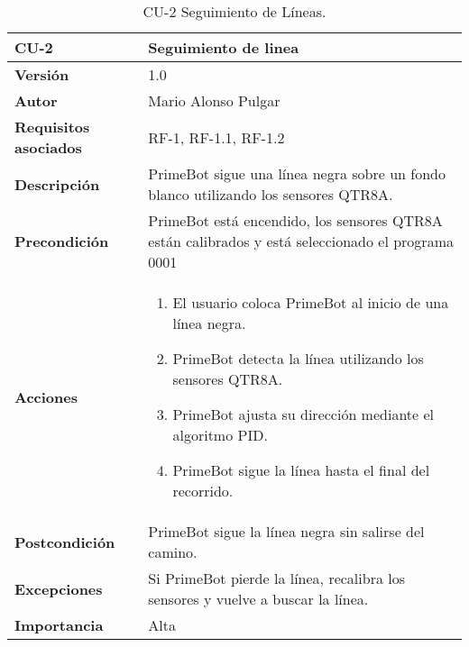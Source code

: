 \begin{table}[p]
	\centering
	\begin{tabularx}{\linewidth}{ p{} p{} }
		\toprule
		\textbf{CU-2}    & \textbf{Seguimiento de linea}\\
		\toprule
		\textbf{Versión}              & 1.0    \\
		\textbf{Autor}                & Mario Alonso Pulgar \\
		\textbf{Requisitos asociados} & RF-1, RF-1.1, RF-1.2\\
		\textbf{Descripción}          & PrimeBot sigue una línea negra sobre un fondo blanco utilizando los sensores QTR8A.\\
		\textbf{Precondición}         & PrimeBot está encendido, los sensores QTR8A están calibrados y está seleccionado el programa 0001\\
		\textbf{Acciones}             &
		\begin{enumerate}
			\def\labelenumi{\arabic{enumi}.}
			\tightlist
				\item El usuario coloca PrimeBot al inicio de una línea negra.
				\item PrimeBot detecta la línea utilizando los sensores QTR8A.
				\item PrimeBot ajusta su dirección mediante el algoritmo PID.
				\item PrimeBot sigue la línea hasta el final del recorrido.
		\end{enumerate}\\
		\textbf{Postcondición}        & PrimeBot sigue la línea negra sin salirse del camino.  \\
		\textbf{Excepciones}          & Si PrimeBot pierde la línea, recalibra los sensores y vuelve a buscar la línea.  \\
		\textbf{Importancia}          & Alta \\
		\bottomrule
	\end{tabularx}
	\caption{CU-2 Seguimiento de Líneas.}
\end{table}

